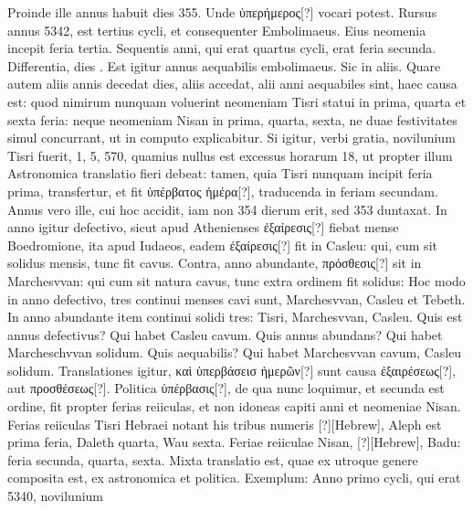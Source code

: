 Proinde
ille annus habuit dies 355.
Unde \textgreek{ὑπερήμερος[?]} vocari potest.
Rursus annus
5342, est tertius cycli, et consequenter Embolimaeus.
Eius neomenia
incepit feria tertia.
Sequentis anni, qui erat quartus cycli, erat feria
secunda.
%
Differentia, dies .
Est igitur annus aequabilis embolimaeus.
Sic in aliis.
Quare autem aliis annis decedat dies, aliis accedat,
alii anni aequabiles sint, haec causa est: quod nimirum nunquam
voluerint neomeniam Tisri statui in prima, quarta et sexta feria: neque
neomeniam Nisan in prima, quarta, sexta, ne duae festivitates simul
concurrant, ut in computo explicabitur.
Si igitur, verbi gratia,
novilunium Tisri fuerit, 1, 5, 570, quamius nullus est excessus horarum
18, ut propter illum Astronomica translatio fieri debeat: tamen,
quia Tisri nunquam incipit feria prima, transfertur,
 et fit \textgreek{ὑπέρβατος
ἡμέρα[?]}, traducenda in feriam secundam.
Annus vero ille, cui hoc accidit,
iam non 354 dierum erit, sed 353 duntaxat.
In anno igitur defectivo,
sicut apud Athenienses \textgreek{ἐξαίρεσις[?]} fiebat mense Boedromione,
ita apud Iudaeos, eadem \textgreek{ἐξαίρεσις[?]} fit in Casleu:
 qui, cum sit solidus mensis,
tunc fit cavus.
Contra, anno abundante, \textgreek{πρόσθεσις[?]} sit in Marchesvvan:
qui cum sit natura cavus, tunc extra ordinem fit solidus:
Hoc modo in anno defectivo, tres continui menses cavi sunt, Marchesvvan,
Casleu et Tebeth.
In anno abundante item continui solidi
tres: Tisri, Marchesvvan, Casleu.
Quis est annus defectivus?
Qui habet
Casleu cavum.
Quis annus abundans?
Qui habet Marcheschvvan %
solidum.
Quis aequabilis?
Qui habet Marchesvvan cavum,
Casleu solidum.
Translationes igitur, \textgreek{καὶ ὑπερβάσεισ ἡμερῶν[?]} sunt causa
\textgreek{ἐξαιρέσεως[?]}, aut \textgreek{προσθέσεως[?]}.
Politica \textgreek{ὑπέρβασις[?]}, de qua nunc loquimur,
et secunda est ordine, fit propter ferias reiiculas, et non idoneas capiti
anni et neomeniae Nisan.
Ferias reiiculas Tisri Hebraei notant his tribus
numeris \texthebrew{[?]}[Hebrew], Aleph est prima feria,
 Daleth quarta, Wau sexta.
Feriae reiiculae Nisan, \texthebrew{[?]}[Hebrew], Badu:
 feria secunda, quarta, sexta.
Mixta
translatio est, quae ex utroque genere composita est, ex astronomica et
politica.
Exemplum: Anno primo cycli, qui erat 5340, novilunium
